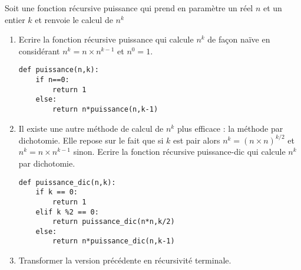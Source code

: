 \documentclass[12pt,fleqn]{article} %
\begin{document}
\begin{exercise}
	Soit une fonction récursive puissance qui prend en paramètre un réel $n$ et un entier $k$ et
	renvoie le calcul de $n^k$
	\begin{enumerate}
		\item Ecrire la fonction récursive puissance qui calcule $n^k$ de façon naïve en considérant $n^k = n\times n^{k-1}$ et $n^0 = 1$.
			\begin{center}
			\begin{varwidth}[t]{.5\textwidth}
				\begin{lstlisting}[language=iPython,linewidth = 13cm]
def puissance(n,k):
	if n==0:
		return 1
	else:
		return n*puissance(n,k-1)
		\end{lstlisting}\end{varwidth}\end{center}
		\item Il existe une autre méthode de calcul de $n^k$ plus efficace : la méthode par dichotomie. Elle repose sur le fait que si $k$ est pair alors $n^k = (n \times n)^{k/2}$ et $n^k = n\times n^{k-1}$ sinon. Ecrire la fonction récursive puissance-dic qui calcule $n^k$ par dichotomie.
	\begin{center}
	\begin{varwidth}[t]{.5\textwidth}
		\begin{lstlisting}[language=iPython,linewidth = 13cm]
def puissance_dic(n,k):
	if k == 0:
		return 1
	elif k %2 == 0:
		return puissance_dic(n*n,k/2)
	else:
		return n*puissance_dic(n,k-1)
\end{lstlisting}\end{varwidth}\end{center}
		\item Transformer la version précédente en récursivité terminale. 
	\end{enumerate}
\end{exercise}
\end{document}
